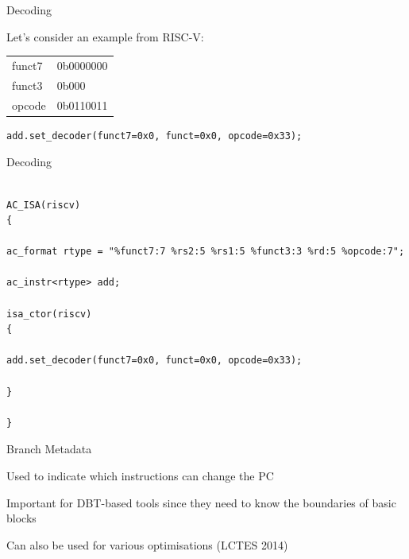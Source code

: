 \begin{frame}[fragile]{Decoding}

Let's consider an example from RISC-V:

\pause


\bigskip
\pause


\pause
\bigskip

\ttfamily\scriptsize{
\begin{tabular}{l l}
funct7 & 0b0000000 \\
funct3 & 0b000 \\
opcode & 0b0110011 \\
\end{tabular}
}

\pause

\begin{lstlisting}
add.set_decoder(funct7=0x0, funct=0x0, opcode=0x33);
\end{lstlisting}

\end{frame}

\begin{frame}[fragile]{Decoding}

\begin{lstlisting}

AC_ISA(riscv)
{

ac_format rtype = "%funct7:7 %rs2:5 %rs1:5 %funct3:3 %rd:5 %opcode:7";

ac_instr<rtype> add;

isa_ctor(riscv)
{

add.set_decoder(funct7=0x0, funct=0x0, opcode=0x33);

}

}

\end{lstlisting}
\end{frame}


\begin{frame}{Branch Metadata}

Used to indicate which instructions can change the PC

Important for DBT-based tools since they need to know the boundaries of basic blocks

Can also be used for various optimisations (LCTES 2014)



\end{frame}

